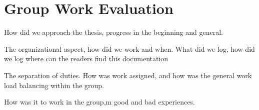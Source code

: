 \section{Group Work Evaluation}
How did we approach the thesis, progress in the beginning and general.

The organizational aspect, how did we work and when. What did we log, how did we log where can the readers find this documentation

The separation of duties. How was work assigned, and how was the general work load balancing within the group. 

How was it to work in the group,m good and bad experiences.
